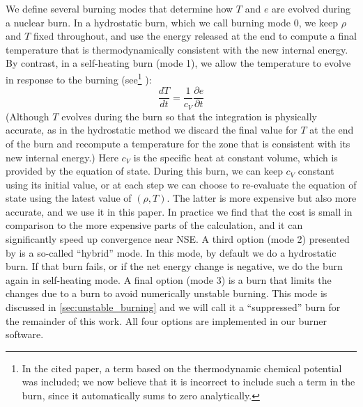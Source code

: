\documentclass[twocolumn,numberedappendix]{../aastex6}
\begin{document}
We define several burning modes that determine how $T$ and $e$ are evolved
during a nuclear burn. In a hydrostatic burn, which we call burning mode 0,
we keep $\rho$ and $T$ fixed throughout, and use 
the energy released at the end to compute a final temperature that is
thermodynamically consistent with the new internal energy. By contrast,
in a self-heating burn (mode 1), we allow the temperature to evolve in response
to the burning (see\footnote{In the cited paper, a term based on the
thermodynamic chemical potential was included; we now believe
that it is incorrect to include such a term in the burn, since it
automatically sums to zero analytically.} \citet{maestro3}):
\begin{equation}
  \frac{dT}{dt} = \frac{1}{c_V}\frac{\partial e}{\partial t}
\end{equation}
(Although $T$ evolves during the burn so that the integration is physically
accurate, as in the hydrostatic method we discard the final value
for $T$ at the end of the burn and recompute a temperature for the zone that is
consistent with its new internal energy.) Here $c_V$ is the specific heat at
constant volume, which is provided by the equation of state.  During this burn,
we can keep $c_V$ constant using its initial value, or at each step we
can choose to re-evaluate the equation of state using the latest value of $(\rho, T)$.
The latter is more expensive but also more accurate, and we use it in this paper.
In practice we find that the cost is small in comparison to the more expensive
parts of the calculation, and it can significantly speed up convergence near NSE.
A third option (mode 2) presented by \citet{raskin:2010} is a so-called ``hybrid'' mode.
In this mode, by default we do a hydrostatic burn. If that burn fails, or if the net
energy change is negative, we do the burn again in self-heating mode. A final option (mode 3)
is a burn that limits the changes due to a burn to avoid numerically unstable burning.
This mode is discussed in \autoref{sec:unstable_burning} and we will call it a
``suppressed'' burn for the remainder of this work. All four options
are implemented in our burner software.
\end{document}
